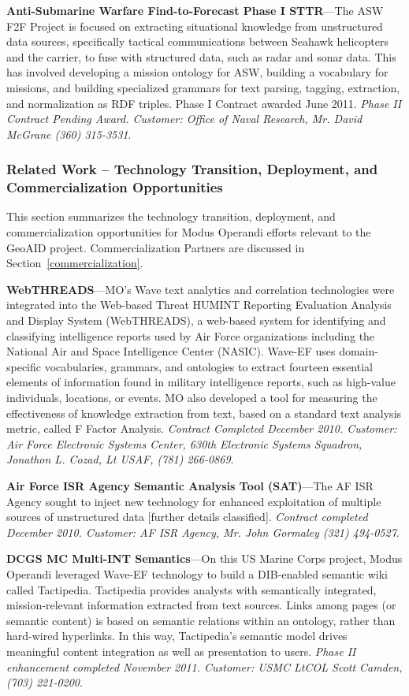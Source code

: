 \documentclass{sbir}
\begin{document}
{\bf Anti-Submarine Warfare Find-to-Forecast Phase I STTR}---The ASW F2F Project is focused on extracting situational knowledge from unstructured data sources, specifically tactical communications between Seahawk helicopters and the carrier, to fuse with structured data, such as radar and sonar data. This has involved developing a mission ontology for ASW, building a vocabulary for missions, and building specialized grammars for text parsing, tagging, extraction, and normalization as RDF triples. Phase I Contract awarded June 2011. \emph{Phase II Contract Pending Award. Customer: Office of Naval Research, Mr. David McGrane (360) 315-3531}.

\subsubsection{Related Work -- Technology Transition, Deployment, and Commercialization Opportunities}
This section summarizes the technology transition, deployment, and commercialization opportunities for Modus Operandi efforts relevant to the GeoAID project. Commercialization Partners are discussed in Section~\ref{commercialization}.

{\bf WebTHREADS}---MO's Wave text analytics and correlation technologies were integrated into the Web-based Threat HUMINT Reporting Evaluation Analysis and Display System (WebTHREADS), a web-based system for identifying and classifying intelligence reports used by Air Force organizations including the National Air and Space Intelligence Center (NASIC). Wave-EF uses domain-specific vocabularies, grammars, and ontologies to extract fourteen essential elements of information found in military intelligence reports, such as high-value individuals, locations, or events. MO also developed a tool for measuring the effectiveness of knowledge extraction from text, based on a standard text analysis metric, called F Factor Analysis. \emph{Contract Completed December 2010. Customer: Air Force Electronic Systems Center, 630th Electronic Systems Squadron, Jonathon L. Cozad,  Lt USAF, (781) 266-0869}.

{\bf Air Force ISR Agency Semantic Analysis Tool (SAT)}---The AF ISR Agency sought to inject new technology for enhanced exploitation of multiple sources of unstructured data [further details classified]. \emph{Contract completed December 2010. Customer: AF ISR Agency, Mr. John Gormaley (321) 494-0527}.

{\bf DCGS MC Multi-INT Semantics}---On this US Marine Corps project, Modus Operandi leveraged Wave-EF technology to build a DIB-enabled semantic wiki called Tactipedia. Tactipedia provides analysts with semantically integrated, mission-relevant information extracted from text sources. Links among pages (or semantic content) is based on semantic relations within an ontology, rather than hard-wired hyperlinks. In this way, Tactipedia's semantic model drives meaningful content integration as well as presentation to users. \emph{Phase II enhancement completed November 2011. Customer: USMC LtCOL Scott Camden, (703) 221-0200}.
\end{document}
